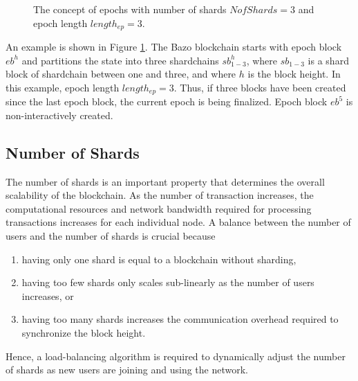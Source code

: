 \begin{figure}[hbt]
  \caption{The concept of epochs with number of shards $NofShards = 3$ and epoch length $length_{ep} = 3$.}
  \label{fig:shard_overview}
\end{figure}

An example is shown in Figure \ref{fig:shard_overview}. The Bazo blockchain starts with epoch block $eb^{h}$ and partitions the state into three shardchains $sb_{1-3}^h$, where $sb_{1-3}$ is a shard block of shardchain between one and three, and where $h$ is the block height. In this example, epoch length $length_{ep} = 3$. Thus, if three blocks have been created since the last epoch block, the current epoch is being finalized. Epoch block $eb^5$ is non-interactively created.

\subsection{Number of Shards}
\label{Design:NumberOfShards}

The number of shards is an important property that determines the overall scalability of the blockchain. As the number of transaction increases, the computational resources and network bandwidth required for processing transactions increases for each individual node. A balance between the number of users and the number of shards is crucial because
\begin{enumerate}
  \item having only one shard is equal to a blockchain without sharding, 
  \item having too few shards only scales sub-linearly as the number of users increases, or
  \item having too many shards increases the communication overhead required to synchronize the block height.
\end{enumerate}
Hence, a load-balancing algorithm is required to dynamically adjust the number of shards as new users are joining and using the network. 


